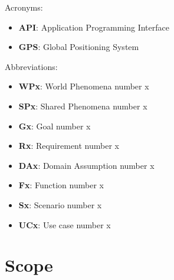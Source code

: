 \documentclass[12pt]{report}
\begin{document}
Acronyms:
\begin{itemize}
    \item\textbf{API}: Application Programming Interface 
    \item\textbf{GPS}: Global Positioning System\\
\end{itemize}

Abbreviations:
\begin{itemize}
    \item\textbf {WPx}: World Phenomena  number x
    \item\textbf {SPx}: Shared Phenomena  number x
    \item\textbf {Gx}: Goal  number x
    \item\textbf {Rx}: Requirement  number x
    \item\textbf {DAx}: Domain Assumption number x
    \item\textbf {Fx}: Function  number x
    \item\textbf {Sx}: Scenario number x
    \item\textbf {UCx}: Use case number x
\end{itemize}

\bigskip

\section{Scope}
\end{document}
